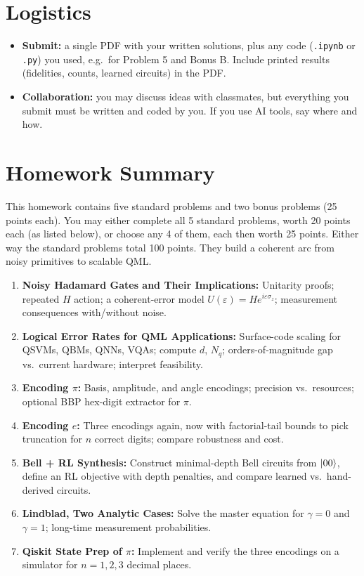 \documentclass[11pt]{article}
\newcounter{problem}
\newcounter{bonus}
\begin{document}
\vspace{1em}

\section*{Logistics}
\begin{itemize}
  \item \textbf{Submit:} a single PDF with your written solutions, plus any code (\texttt{.ipynb} or \texttt{.py}) you used, e.g.\ for Problem 5 and Bonus B. Include printed results (fidelities, counts, learned circuits) in the PDF.
  \item \textbf{Collaboration:} you may discuss ideas with classmates, but everything you submit must be written and coded by you. If you use AI tools, say where and how.
\end{itemize}

\section*{Homework Summary}
This homework contains five standard problems and two bonus problems (25 points each). You may either complete all 5 standard problems, worth 20 points each (as listed below), or choose any 4 of them, each then worth 25 points. Either way the standard problems total 100 points. They build a coherent arc from noisy primitives to scalable QML.

\begin{enumerate}
  \item \textbf{Noisy Hadamard Gates and Their Implications:} Unitarity proofs; repeated $H$ action; a coherent-error model $U(\varepsilon)=H e^{i\varepsilon\sigma_z}$; measurement consequences with/without noise.
  \item \textbf{Logical Error Rates for QML Applications:} Surface-code scaling for QSVMs, QBMs, QNNs, VQAs; compute $d$, $N_q$; orders-of-magnitude gap vs.\ current hardware; interpret feasibility.
  \item \textbf{Encoding \(\pi\):} Basis, amplitude, and angle encodings; precision vs.\ resources; optional BBP hex-digit extractor for $\pi$.
  \item \textbf{Encoding \(e\):} Three encodings again, now with factorial-tail bounds to pick truncation for $n$ correct digits; compare robustness and cost.
  \item \textbf{Bell + RL Synthesis:} Construct minimal-depth Bell circuits from $\ket{00}$, define an RL objective with depth penalties, and compare learned vs.\ hand-derived circuits.
  \item[\textbf{Bonus A.}] \textbf{Lindblad, Two Analytic Cases:} Solve the master equation for $\gamma=0$ and $\gamma=1$; long-time measurement probabilities.
  \item[\textbf{Bonus B.}] \textbf{Qiskit State Prep of \(\pi\):} Implement and verify the three encodings on a simulator for $n=1,2,3$ decimal places.
\end{enumerate}
\end{document}
